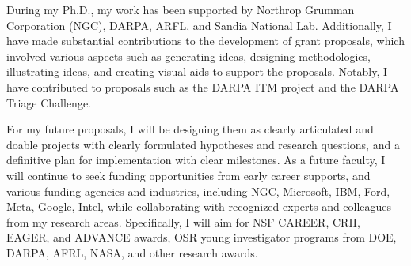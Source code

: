 During my Ph.D., my work has been supported by Northrop Grumman Corporation (NGC), 
DARPA, ARFL, and Sandia National Lab. 
Additionally, I have made substantial contributions to the development of grant proposals, which involved various aspects such as generating ideas, designing methodologies, illustrating ideas, and creating visual aids to support the proposals. Notably, I have contributed to proposals such as the DARPA ITM project and the DARPA Triage Challenge.

For my future proposals, %
I will be designing them as clearly articulated and doable projects with clearly formulated hypotheses and research questions, and a definitive plan for implementation with clear milestones. 
As a future faculty, I will continue to seek funding opportunities %
from early career supports, and various funding agencies %
and industries, including NGC, Microsoft, IBM, Ford, Meta, Google, Intel, while collaborating with recognized experts and colleagues from my research areas.
Specifically, I will aim for NSF CAREER, CRII, EAGER, and ADVANCE awards, OSR young investigator programs from DOE, DARPA, AFRL, NASA, and other research awards. 









